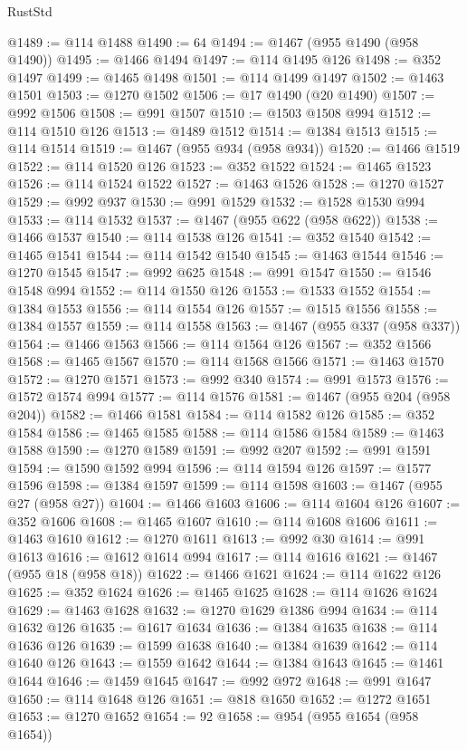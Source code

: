 \begin{lexlean}{RustStd}
\begin{coremodule}
{\begin{coremodule}
{{{{{{{{{{{{{{{{{{{{{{{{{{{{{{{{{{{{{{{{{{{{{{{{{{@1489 := @114 @1488
@1490 := 64
@1494 := @1467 (@955 @1490 (@958 @1490))
@1495 := @1466 @1494
@1497 := @114 @1495 @126
@1498 := @352 @1497
@1499 := @1465 @1498
@1501 := @114 @1499 @1497
@1502 := @1463 @1501
@1503 := @1270 @1502
@1506 := @17 @1490 (@20 @1490)
@1507 := @992 @1506
@1508 := @991 @1507
@1510 := @1503 @1508 @994
@1512 := @114 @1510 @126
@1513 := @1489 @1512
@1514 := @1384 @1513
@1515 := @114 @1514
@1519 := @1467 (@955 @934 (@958 @934))
@1520 := @1466 @1519
@1522 := @114 @1520 @126
@1523 := @352 @1522
@1524 := @1465 @1523
@1526 := @114 @1524 @1522
@1527 := @1463 @1526
@1528 := @1270 @1527
@1529 := @992 @937
@1530 := @991 @1529
@1532 := @1528 @1530 @994
@1533 := @114 @1532
@1537 := @1467 (@955 @622 (@958 @622))
@1538 := @1466 @1537
@1540 := @114 @1538 @126
@1541 := @352 @1540
@1542 := @1465 @1541
@1544 := @114 @1542 @1540
@1545 := @1463 @1544
@1546 := @1270 @1545
@1547 := @992 @625
@1548 := @991 @1547
@1550 := @1546 @1548 @994
@1552 := @114 @1550 @126
@1553 := @1533 @1552
@1554 := @1384 @1553
@1556 := @114 @1554 @126
@1557 := @1515 @1556
@1558 := @1384 @1557
@1559 := @114 @1558
@1563 := @1467 (@955 @337 (@958 @337))
@1564 := @1466 @1563
@1566 := @114 @1564 @126
@1567 := @352 @1566
@1568 := @1465 @1567
@1570 := @114 @1568 @1566
@1571 := @1463 @1570
@1572 := @1270 @1571
@1573 := @992 @340
@1574 := @991 @1573
@1576 := @1572 @1574 @994
@1577 := @114 @1576
@1581 := @1467 (@955 @204 (@958 @204))
@1582 := @1466 @1581
@1584 := @114 @1582 @126
@1585 := @352 @1584
@1586 := @1465 @1585
@1588 := @114 @1586 @1584
@1589 := @1463 @1588
@1590 := @1270 @1589
@1591 := @992 @207
@1592 := @991 @1591
@1594 := @1590 @1592 @994
@1596 := @114 @1594 @126
@1597 := @1577 @1596
@1598 := @1384 @1597
@1599 := @114 @1598
@1603 := @1467 (@955 @27 (@958 @27))
@1604 := @1466 @1603
@1606 := @114 @1604 @126
@1607 := @352 @1606
@1608 := @1465 @1607
@1610 := @114 @1608 @1606
@1611 := @1463 @1610
@1612 := @1270 @1611
@1613 := @992 @30
@1614 := @991 @1613
@1616 := @1612 @1614 @994
@1617 := @114 @1616
@1621 := @1467 (@955 @18 (@958 @18))
@1622 := @1466 @1621
@1624 := @114 @1622 @126
@1625 := @352 @1624
@1626 := @1465 @1625
@1628 := @114 @1626 @1624
@1629 := @1463 @1628
@1632 := @1270 @1629 @1386 @994
@1634 := @114 @1632 @126
@1635 := @1617 @1634
@1636 := @1384 @1635
@1638 := @114 @1636 @126
@1639 := @1599 @1638
@1640 := @1384 @1639
@1642 := @114 @1640 @126
@1643 := @1559 @1642
@1644 := @1384 @1643
@1645 := @1461 @1644
@1646 := @1459 @1645
@1647 := @992 @972
@1648 := @991 @1647
@1650 := @114 @1648 @126
@1651 := @818 @1650
@1652 := @1272 @1651
@1653 := @1270 @1652
@1654 := 92
@1658 := @954 (@955 @1654 (@958 @1654))
}}}}}}}}}}}}}}}}}}}}}}}}}}}}}}}}}}}}}}}}}}}}}}}}}}
\end{coremodule}}
\end{coremodule}
\end{lexlean}
